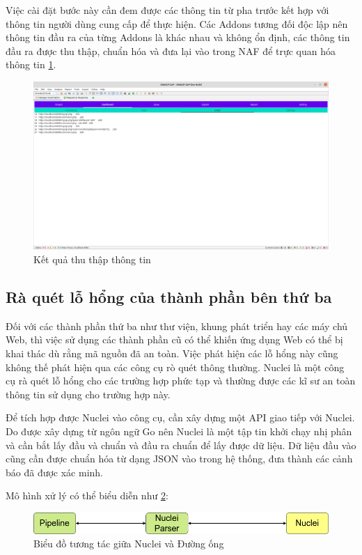 \documentclass[./../main.tex]{subfiles}
\begin{document}
Việc cài đặt bước này cần đem được các thông tin từ pha trước kết hợp
với thông tin người dùng cung cấp để thực hiện. Các Addons tương đối độc
lập nên thông tin đầu ra của từng Addons là khác nhau và không ổn định,
các thông tin đầu ra được thu thập, chuẩn hóa và đưa lại vào trong NAF
để trực quan hóa thông tin \ref{fig:scan_result}.

\begin{figure}[ht!]
	\includegraphics[width=\linewidth]{./images/scan_result.png}
	\caption{Kết quả thu thập thông tin}
	\label{fig:scan_result}
\end{figure}

\subsection{Rà quét lỗ hổng của thành phần bên thứ ba}

Đối với các thành phần thứ ba như thư viện, khung phát triển hay các máy chủ Web,
thì việc sử dụng các thành phần cũ có thể khiến ứng dụng Web có thể bị khai thác
dù rằng mã nguồn đã an toàn. Việc phát hiện các lỗ hổng này cũng không thế  phát
hiện qua các công cụ rò quét thông thường. Nuclei là một công cụ rà quét lỗ hổng
cho các trường hợp phức tạp và thường được các kĩ sư an toàn thông tin sử dụng cho
trường hợp này.

Để tích hợp được Nuclei vào công cụ, cần xây dựng một API giao tiếp với Nuclei. Do
được xây dựng từ ngôn ngữ Go nên Nuclei là một tập tin khởi chạy nhị phân và cần bắt
lấy đầu và chuẩn và đầu ra chuẩn để lấy được dữ liệu. Dữ liệu đầu vào cũng cần được
chuẩn hóa từ dạng JSON vào trong hệ thống, đưa thành các cảnh báo đã được xác minh.

Mô hình xử lý có thể biểu diễn như \ref{fig:nuclei}:

\begin{figure}[ht!]
	\includegraphics[width=\linewidth]{./images/nuclei.png}
	\caption{Biểu đồ tương tác giữa Nuclei và Đường ống}
	\label{fig:nuclei}
\end{figure}
\end{document}

